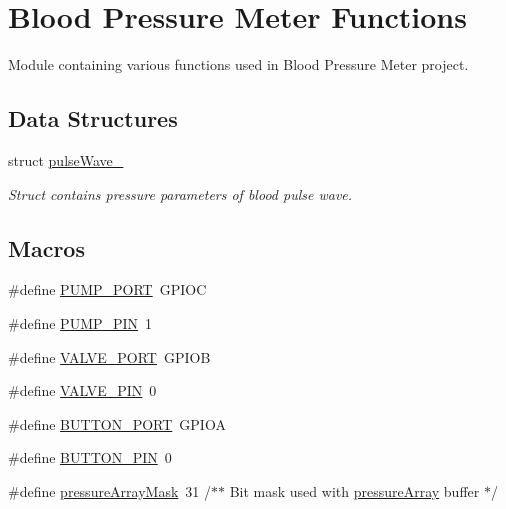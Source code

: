\hypertarget{group___blood_pressure_meter_functions}{}\section{Blood Pressure Meter Functions}
\label{group___blood_pressure_meter_functions}


Module containing various functions used in Blood Pressure Meter project.  


\subsection*{Data Structures}
\begin{DoxyCompactItemize}
\item 
struct \mbox{\hyperlink{structpulse_wave__}{pulse\+Wave\+\_\+}}
\begin{DoxyCompactList}\small\item\em Struct contains pressure parameters of blood pulse wave. \end{DoxyCompactList}\end{DoxyCompactItemize}
\subsection*{Macros}
\begin{DoxyCompactItemize}
\item 
\#define \mbox{\hyperlink{group___blood_pressure_meter_functions_ga4ccd67103f1fbc1580ba09d37bf2d410_ga4ccd67103f1fbc1580ba09d37bf2d410}{P\+U\+M\+P\+\_\+\+P\+O\+RT}}~G\+P\+I\+OC
\item 
\#define \mbox{\hyperlink{group___blood_pressure_meter_functions_ga02a786fd2e2f38748aa579ebd58ee8c0_ga02a786fd2e2f38748aa579ebd58ee8c0}{P\+U\+M\+P\+\_\+\+P\+IN}}~1
\item 
\#define \mbox{\hyperlink{group___blood_pressure_meter_functions_gac0c3383cb912e60b85763268204aa8d5_gac0c3383cb912e60b85763268204aa8d5}{V\+A\+L\+V\+E\+\_\+\+P\+O\+RT}}~G\+P\+I\+OB
\item 
\#define \mbox{\hyperlink{group___blood_pressure_meter_functions_ga9d9daf9f542b99a53806e892a9a66518_ga9d9daf9f542b99a53806e892a9a66518}{V\+A\+L\+V\+E\+\_\+\+P\+IN}}~0
\item 
\#define \mbox{\hyperlink{group___blood_pressure_meter_functions_gac8ba909fc8614df64040d2e12c0780e4_gac8ba909fc8614df64040d2e12c0780e4}{B\+U\+T\+T\+O\+N\+\_\+\+P\+O\+RT}}~G\+P\+I\+OA
\item 
\#define \mbox{\hyperlink{group___blood_pressure_meter_functions_gabc2ad14f0789907024ac765711ffd3da_gabc2ad14f0789907024ac765711ffd3da}{B\+U\+T\+T\+O\+N\+\_\+\+P\+IN}}~0
\item 
\#define \mbox{\hyperlink{group___blood_pressure_meter_functions_ga130d4bf1fba7d0a968df4eca98224c1e_ga130d4bf1fba7d0a968df4eca98224c1e}{pressure\+Array\+Mask}}~31                 /$\ast$$\ast$ Bit mask used with \mbox{\hyperlink{group___blood_pressure_meter_functions_ga074212e81e34d1ed11bfa7238aaa15d0_ga074212e81e34d1ed11bfa7238aaa15d0}{pressure\+Array}} buffer $\ast$/
\end{DoxyCompactItemize}
